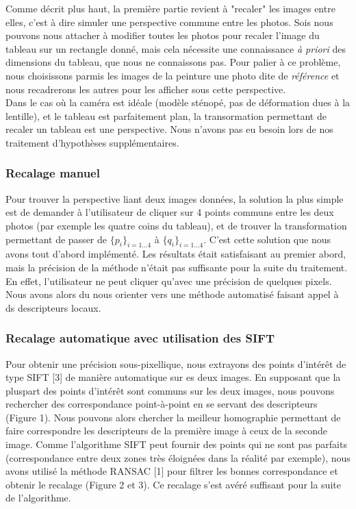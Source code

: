 \documentclass[12pt,a4paper]{article}
\begin{document}
Comme décrit plus haut, la première partie revient à "recaler" les images entre elles, c'est à dire simuler une perspective commune entre les photos. Sois nous pouvons nous attacher à modifier toutes les photos pour recaler l'image du tableau sur un rectangle donné, mais cela nécessite une connaissance \emph{à priori} des dimensions du tableau, que nous ne connaissons pas. Pour palier à ce problème, nous choisissons parmis les images de la peinture une photo dite de \emph{référence} et nous recadrerons les autres pour les afficher sous cette perspective.\\

Dans le cas où la caméra est idéale (modèle sténopé, pas de déformation dues à la lentille), et le tableau est parfaitement plan, la transormation permettant de recaler un tableau est une perspective. Nous n'avons pas eu besoin lors de nos traitement d'hypothèses supplémentaires.

\subsubsection{Recalage manuel}
Pour trouver la perspective liant deux images données, la solution la plus simple est de demander à l'utilisateur de cliquer sur 4 points communs entre les deux photos (par exemple les quatre coins du tableau), et de trouver la transformation permettant de passer de $\{p_i\}_{i=1...4}$ à  $\{q_i\}_{i=1...4}$. C'est cette solution que nous avons tout d'abord implémenté. Les résultats était satisfaisant au premier abord, mais la précision de la méthode n'était pas suffisante pour la suite du traitement. En effet, l'utilisateur ne peut cliquer qu'avec une précision de quelques pixels. Nous avons alors du nous orienter vers une méthode automatisé faisant appel à ds descripteurs locaux.

\subsubsection{Recalage automatique avec utilisation des  SIFT}

Pour obtenir une précision sous-pixellique, nous extrayons des points d'intérêt de type SIFT [3] de manière automatique sur es deux images. En supposant que la pluspart des points d'intérêt sont communs sur les deux images, nous pouvons rechercher des correspondance point-à-point en se servant des descripteurs (Figure 1). Nous pouvons alors chercher la meilleur homographie permettant de faire correspondre les descripteurs de la première image à ceux de la seconde image. Comme l'algorithme SIFT peut fournir des points qui ne sont pas parfaits (correspondance entre deux zones très éloignées dans la réalité par exemple), nous avons utilisé la méthode RANSAC [1] pour filtrer les bonnes correspondance et obtenir le recalage (Figure 2 et 3). Ce recalage s'est avéré suffisant pour la suite de l'algorithme.
\end{document}
